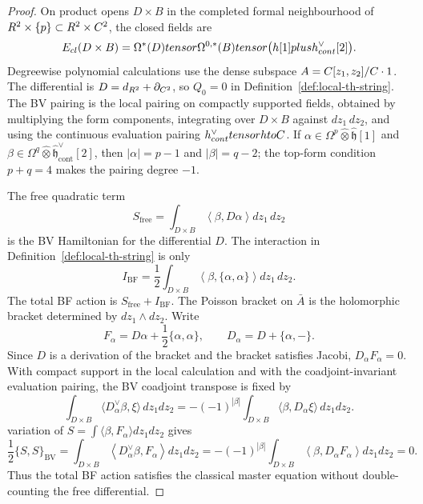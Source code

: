 \documentclass[11pt]{memoir}
\begin{document}
\begin{proof}
  On product opens $D\times B$ in the completed formal neighbourhood of
  $R^2\times\{p\}\subset R^2\times C^2$, the closed fields are
  $$E_{cl}(D\times B)=
    \Omega^*(D)tensor\Omega^{0,*}(B)tensor
    \bigl(h[1]plus
    h^{\vee}_{cont}[2]\bigr).$$
  Degreewise polynomial calculations use the dense subspace
  $A=C[z_1,z_2]/C\cdot1$. The differential is
  $D=d_{R^2}+\partial_{C^2}$, so $Q_0=0$ in
  Definition~\ref{def:local-th-string}. The BV pairing is the local pairing on
  compactly supported fields, obtained by multiplying the form components,
  integrating over $D\times B$ against $dz_1\,dz_2$, and using the continuous
  evaluation pairing
  $h^{\vee}_{cont}tensor
  htoC$. If
  $\alpha\in\Omega^p\widehat{\otimes}\widehat{\mathfrak h}[1]$ and
  $\beta\in\Omega^q\widehat{\otimes}
  \widehat{\mathfrak h}^{\vee}_{\mathrm{cont}}[2]$, then
  $|\alpha|=p-1$ and $|\beta|=q-2$; the top-form condition $p+q=4$ makes the
  pairing degree $-1$.

  The free quadratic term
  $$S_{\mathrm{free}}=\int_{D\times B}
    \left\langle\beta,D\alpha\right\rangle dz_1\,dz_2$$
  is the BV Hamiltonian for the differential $D$. The interaction in
  Definition~\ref{def:local-th-string} is only
  $$I_{\mathrm{BF}}=\frac12\int_{D\times B}
    \left\langle\beta,\{\alpha,\alpha\}\right\rangle dz_1\,dz_2.$$
  The total BF action is $S_{\mathrm{free}}+I_{\mathrm{BF}}$.
  The Poisson bracket on $\bar A$ is the holomorphic bracket determined by
  $dz_1\wedge dz_2$. Write
  \[
    F_\alpha=D\alpha+\frac12\{\alpha,\alpha\},\qquad
    D_\alpha=D+\{\alpha,-\}.
  \]
  Since \(D\) is a derivation of the bracket and the bracket satisfies
  Jacobi, \(D_\alpha F_\alpha=0\). With compact support in the local
	  calculation and with the coadjoint-invariant evaluation pairing, the BV
	  coadjoint transpose is fixed by
	  \[
	    \int_{D\times B}\langle D_\alpha^\vee\beta,\xi\rangle\,dz_1dz_2
	    =
	    -(-1)^{|\beta|}
	    \int_{D\times B}\langle\beta,D_\alpha\xi\rangle\,dz_1dz_2 .
	  \]
	  variation of \(S=\int\langle\beta,F_\alpha\rangle dz_1dz_2\) gives
	  \[
	    \frac12\{S,S\}_{\mathrm{BV}}
	      =\int_{D\times B}
	        \left\langle D_\alpha^\vee\beta,F_\alpha\right\rangle dz_1dz_2
	      =-(-1)^{|\beta|}\int_{D\times B}
	        \left\langle\beta,D_\alpha F_\alpha\right\rangle dz_1dz_2
	      =0.
	  \]
  Thus the total BF action satisfies the classical master equation without
  double-counting the free differential.


\end{proof}
\end{document}
